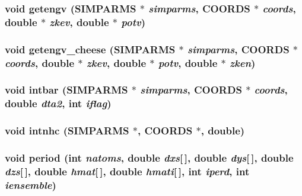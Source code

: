 \subsubsection{\setlength{\rightskip}{0pt plus 5cm}void getengv ({\bf SIMPARMS} $\ast$ {\em simparms}, {\bf COORDS} $\ast$ {\em coords}, double $\ast$ {\em zkev}, double $\ast$ {\em potv})}\label{proto__integrate_8h_8f6b220b5497a9d83e02b4949112aa6b}


\subsubsection{\setlength{\rightskip}{0pt plus 5cm}void getengv\_\-cheese ({\bf SIMPARMS} $\ast$ {\em simparms}, {\bf COORDS} $\ast$ {\em coords}, double $\ast$ {\em zkev}, double $\ast$ {\em potv}, double $\ast$ {\em zken})}\label{proto__integrate_8h_254a20535f90eca030f210db5ed233fc}


\subsubsection{\setlength{\rightskip}{0pt plus 5cm}void intbar ({\bf SIMPARMS} $\ast$ {\em simparms}, {\bf COORDS} $\ast$ {\em coords}, double {\em dta2}, int {\em iflag})}\label{proto__integrate_8h_dc8a3b70853b7fac5ee77bb389205afb}


\subsubsection{\setlength{\rightskip}{0pt plus 5cm}void intnhc ({\bf SIMPARMS} $\ast$, {\bf COORDS} $\ast$, double)}\label{proto__integrate_8h_fe8a392b98ffc10699904b2367e983bb}


\subsubsection{\setlength{\rightskip}{0pt plus 5cm}void period (int {\em natoms}, double {\em dxs}[$\,$], double {\em dys}[$\,$], double {\em dzs}[$\,$], double {\em hmat}[$\,$], double {\em hmati}[$\,$], int {\em iperd}, int {\em iensemble})}\label{proto__integrate_8h_17adce6e743f0dfd43a8d1e6c5435de8}


